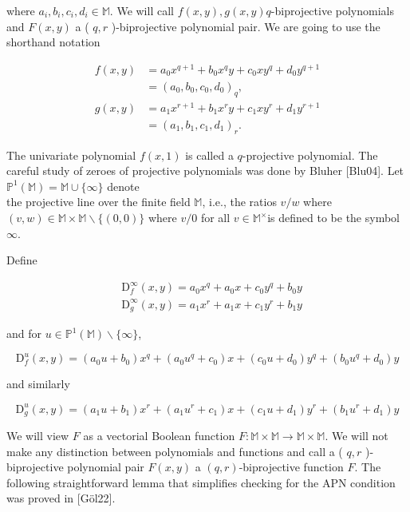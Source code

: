 \documentclass[10pt]{article}
\begin{document}
where $a_{i}, b_{i}, c_{i}, d_{i} \in \mathbb{M}$. We will call $f(x, y), g(x, y) q$-biprojective polynomials and $F(x, y)$ a ( $q, r$ )-biprojective polynomial pair. We are going to use the shorthand notation

$$
\begin{aligned}
f(x, y) & =a_{0} x^{q+1}+b_{0} x^{q} y+c_{0} x y^{q}+d_{0} y^{q+1} \\
& =\left(a_{0}, b_{0}, c_{0}, d_{0}\right)_{q}, \\
g(x, y) & =a_{1} x^{r+1}+b_{1} x^{r} y+c_{1} x y^{r}+d_{1} y^{r+1} \\
& =\left(a_{1}, b_{1}, c_{1}, d_{1}\right)_{r} .
\end{aligned}
$$

The univariate polynomial $f(x, 1)$ is called a $q$-projective polynomial. The careful study of zeroes of projective polynomials was done by Bluher [Blu04]. Let $\mathbb{P}^{1}(\mathbb{M})=\mathbb{M} \cup\{\infty\}$ denote\\
the projective line over the finite field $\mathbb{M}$, i.e., the ratios $v / w$ where $(v, w) \in \mathbb{M} \times \mathbb{M} \backslash\{(0,0)\}$ where $v / 0$ for all $v \in \mathbb{M}^{\times}$is defined to be the symbol $\infty$.

Define

$$
\begin{aligned}
& \mathrm{D}_{f}^{\infty}(x, y)=a_{0} x^{q}+a_{0} x+c_{0} y^{q}+b_{0} y \\
& \mathrm{D}_{g}^{\infty}(x, y)=a_{1} x^{r}+a_{1} x+c_{1} y^{r}+b_{1} y
\end{aligned}
$$

and for $u \in \mathbb{P}^{1}(\mathbb{M}) \backslash\{\infty\}$,

$$
\mathrm{D}_{f}^{u}(x, y)=\left(a_{0} u+b_{0}\right) x^{q}+\left(a_{0} u^{q}+c_{0}\right) x+\left(c_{0} u+d_{0}\right) y^{q}+\left(b_{0} u^{q}+d_{0}\right) y
$$

and similarly

$$
\mathrm{D}_{g}^{u}(x, y)=\left(a_{1} u+b_{1}\right) x^{r}+\left(a_{1} u^{r}+c_{1}\right) x+\left(c_{1} u+d_{1}\right) y^{r}+\left(b_{1} u^{r}+d_{1}\right) y
$$

We will view $F$ as a vectorial Boolean function $F: \mathbb{M} \times \mathbb{M} \rightarrow \mathbb{M} \times \mathbb{M}$. We will not make any distinction between polynomials and functions and call a ( $q, r$ )-biprojective polynomial pair $F(x, y)$ a $(q, r)$-biprojective function $F$. The following straightforward lemma that simplifies checking for the APN condition was proved in [Göl22].
\end{document}
